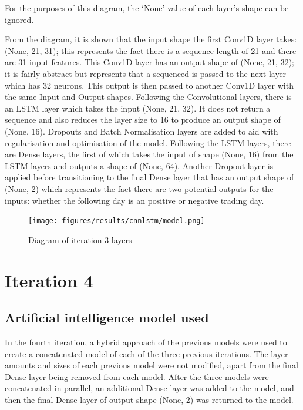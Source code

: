 For the purposes of this diagram, the `None' value of each layer's shape can be ignored.

From the diagram, it is shown that the input shape the first Conv1D layer takes: (None, 21, 31); this represents the
fact there is a sequence length of 21 and there are 31 input features.  This Conv1D layer has an output shape of (None, 21, 32); it is fairly abstract
but represents that a sequenced is passed to the next layer which has 32 neurons. This output is then passed to another
Conv1D layer with the same Input and Output shapes. Following the Convolutional layers, there is an LSTM layer
which takes the input (None, 21, 32). It does not return a sequence and also reduces the layer size to 16 to produce an
output shape of (None, 16). Dropouts and Batch Normalisation layers are added to aid with regularisation and optimisation of the model.
Following the LSTM layers, there are Dense layers, the first of which takes the input of shape (None, 16) from the
LSTM layers and outputs a shape of (None, 64). Another Dropout layer is applied before transitioning to the final Dense layer that has an output shape of (None, 2)
which represents the fact there are two potential outputs for the inputs: whether the following day
is an positive or negative trading day.

\begin{figure}[ht]
    \centering
    \texttt{[image: figures/results/cnnlstm/model.png]}
    \caption[Diagram of iteration 3 layers]{Diagram of iteration 3 layers}
    \label{fig:iteration3_model}
\end{figure}
\FloatBarrier

\section{Iteration 4}
\subsection{Artificial intelligence model used}\label{ssec:iteration4_ai_model}
In the fourth iteration, a hybrid approach of the previous models were used to create a concatenated model of each
of the three previous iterations. The layer amounts and sizes of each previous model were not modified, apart from
the final Dense layer being removed from each model. After the three models were concatenated in parallel,
an additional Dense layer was added to the model, and then the final Dense layer of output shape (None, 2) was returned to the model.

